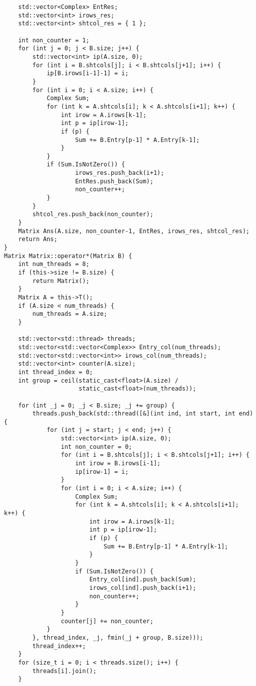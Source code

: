 \documentclass[12pt]{report}
\begin{document}
\begin{lstlisting}
    std::vector<Complex> EntRes;
    std::vector<int> irows_res;
    std::vector<int> shtcol_res = { 1 };

    int non_counter = 1;
    for (int j = 0; j < B.size; j++) {
        std::vector<int> ip(A.size, 0);
        for (int i = B.shtcols[j]; i < B.shtcols[j+1]; i++) {
            ip[B.irows[i-1]-1] = i;
        }
        for (int i = 0; i < A.size; i++) {
            Complex Sum;
            for (int k = A.shtcols[i]; k < A.shtcols[i+1]; k++) {
                int irow = A.irows[k-1];
                int p = ip[irow-1];
                if (p) {
                    Sum += B.Entry[p-1] * A.Entry[k-1];
                }
            }
            if (Sum.IsNotZero()) {
                    irows_res.push_back(i+1);
                    EntRes.push_back(Sum);
                    non_counter++;
            }
        }
        shtcol_res.push_back(non_counter);
    }
    Matrix Ans(A.size, non_counter-1, EntRes, irows_res, shtcol_res);
    return Ans;
}
Matrix Matrix::operator*(Matrix B) {
    int num_threads = 8;
    if (this->size != B.size) {
        return Matrix();
    }
    Matrix A = this->T();
    if (A.size < num_threads) {
        num_threads = A.size;
    }

    std::vector<std::thread> threads;
    std::vector<std::vector<Complex>> Entry_col(num_threads);
    std::vector<std::vector<int>> irows_col(num_threads);
    std::vector<int> counter(A.size);
    int thread_index = 0;
    int group = ceil(static_cast<float>(A.size) /
                     static_cast<float>(num_threads));

    for (int _j = 0; _j < B.size; _j += group) {
        threads.push_back(std::thread([&](int ind, int start, int end) {
            for (int j = start; j < end; j++) {
                std::vector<int> ip(A.size, 0);
                int non_counter = 0;
                for (int i = B.shtcols[j]; i < B.shtcols[j+1]; i++) {
                    int irow = B.irows[i-1];
                    ip[irow-1] = i;
                }
                for (int i = 0; i < A.size; i++) {
                    Complex Sum;
                    for (int k = A.shtcols[i]; k < A.shtcols[i+1]; k++) {
                        int irow = A.irows[k-1];
                        int p = ip[irow-1];
                        if (p) {
                            Sum += B.Entry[p-1] * A.Entry[k-1];
                        }
                    }
                    if (Sum.IsNotZero()) {
                        Entry_col[ind].push_back(Sum);
                        irows_col[ind].push_back(i+1);
                        non_counter++;
                    }
                }
                counter[j] += non_counter;
            }
        }, thread_index, _j, fmin(_j + group, B.size)));
        thread_index++;
    }
    for (size_t i = 0; i < threads.size(); i++) {
        threads[i].join();
    }


\end{lstlisting}
\end{document}
